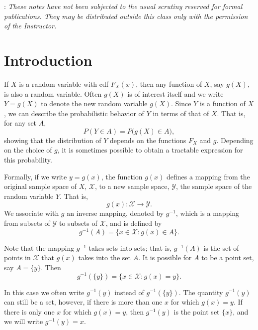 \documentclass{article}
\theoremstyle{plain}
\theoremstyle{definition}
\begin{document}

: {\it These notes have not been subjected to
the usual scrutiny reserved for formal publications.  They may be
distributed outside this class only with the permission of the
Instructor.} %

\section{Introduction}

If $X$ is a random variable with cdf $F_X(x)$, then any function of $X$, say $g(X)$, is
also a random variable. Often $g(X)$ is of interest itself and we write $Y=g(X)$ to
denote the new random variable $g(X)$. Since $Y$ is a function of $X$, we can describe
the probabilistic behavior of $Y$ in terms of that of $X$. That is, for any set $A$,
\[
P(Y\in A)=P\bigl(g(X)\in A\bigr),
\]
showing that the distribution of $Y$ depends on the functions $F_X$ and $g$. Depending
on the choice of $g$, it is sometimes possible to obtain a tractable expression for this
probability.

Formally, if we write $y=g(x)$, the function $g(x)$ defines a mapping from the original
sample space of $X$, $\mathcal{X}$, to a new sample space, $\mathcal{Y}$, the sample
space of the random variable $Y$. That is,
\[
g(x):\mathcal{X}\to\mathcal{Y}.
\]
We associate with $g$ an inverse mapping, denoted by $g^{-1}$, which is a mapping from
subsets of $\mathcal{Y}$ to subsets of $\mathcal{X}$, and is defined by
\begin{equation*}
g^{-1}(A)=\{x\in\mathcal{X}: g(x)\in A\}.
\end{equation*}

Note that the mapping $g^{-1}$ takes sets into sets; that is, $g^{-1}(A)$ is the set of
points in $\mathcal{X}$ that $g(x)$ takes into the set $A$. It is possible for $A$ to be
a point set, say $A=\{y\}$. Then
\[
g^{-1}(\{y\})=\{x\in\mathcal{X}: g(x)=y\}.
\]

In this case we often write $g^{-1}(y)$ instead of $g^{-1}(\{y\})$. The quantity
$g^{-1}(y)$ can still be a set, however, if there is more than one $x$ for which
$g(x)=y$. If there is only one $x$ for which $g(x)=y$, then $g^{-1}(y)$ is the point
set $\{x\}$, and we will write $g^{-1}(y)=x$. 
\end{document}
